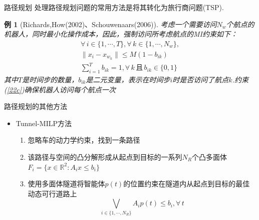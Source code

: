 \documentclass[notheorems,11pt]{beamer}
\theoremstyle{plain}
\numberwithin{theorem}{section}
\numberwithin{lemma}{section}
\numberwithin{corollary}{section}
\theoremstyle{example}
\newtheorem{example}{例}
\begin{document}
\begin{frame}{路径规划}
  处理路径规划问题的常用方法是将其转化为旅行商问题(TSP).
  \begin{example}[Richards,How(2002)、Schouwenaars(2006)]
    考虑一个需要访问$N_w$个航点的机器人，同时最小化操作成本，因此，强制访问所考虑航点的MI约束如下：
    \begin{subequations}
      \begin{gather}
        \forall\, i\in\{1,\cdots,T\},\forall\, k\in\{1,\cdots,N_w\}, \\
        \|x_i-x_{w_k}\|\leqslant M(1-b_{ik}) \\
        \sum_{i=1}^T{b_{ik}}=1,\forall\, k\,\text{且}\, b_{ik}\in\{0,1\} \label{22c}
      \end{gather}
    \end{subequations}
    其中$T$是时间步的数量，$b_{ik}$是二元变量，表示在时间步$i$时是否访问了航点$k$.约束(\ref{22c})确保机器人访问每个航点一次
  \end{example}

\end{frame}

\begin{frame}{路径规划的其他方法}
  \begin{itemize}
    \item Tunnel-MILP方法
    \begin{enumerate}
      \item 忽略车的动力学约束，找到一条路径
      \item 该路径与空间的凸分解形成从起点到目标的一系列$N_R$个凸多面体$F_i=\{x\in\mathbb{R}^2:A_ix\leqslant b_i\}$
      \item 使用多面体隧道将智能体$p(t)$的位置约束在隧道内从起点到目标的最佳动态可行道路上
      \begin{equation}
      \bigvee_{i\in\{1,\cdots,N_R\}}{A_ip(t)\leqslant b_i},\forall\, t
    \end{equation}
    \end{enumerate}
  \end{itemize}

\end{frame}
\end{document}
